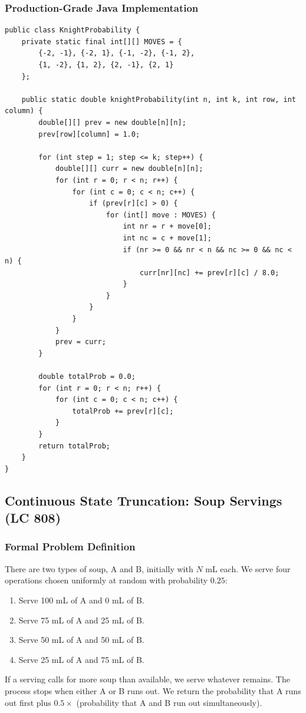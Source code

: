 \documentclass[10pt,journal,compsoc,onecolumn]{IEEEtran}
\begin{document}
\subsubsection{Production-Grade Java Implementation}

\begin{verbatim}
public class KnightProbability {
    private static final int[][] MOVES = {
        {-2, -1}, {-2, 1}, {-1, -2}, {-1, 2},
        {1, -2}, {1, 2}, {2, -1}, {2, 1}
    };

    public static double knightProbability(int n, int k, int row, int column) {
        double[][] prev = new double[n][n];
        prev[row][column] = 1.0;

        for (int step = 1; step <= k; step++) {
            double[][] curr = new double[n][n];
            for (int r = 0; r < n; r++) {
                for (int c = 0; c < n; c++) {
                    if (prev[r][c] > 0) {
                        for (int[] move : MOVES) {
                            int nr = r + move[0];
                            int nc = c + move[1];
                            if (nr >= 0 && nr < n && nc >= 0 && nc < n) {
                                curr[nr][nc] += prev[r][c] / 8.0;
                            }
                        }
                    }
                }
            }
            prev = curr;
        }

        double totalProb = 0.0;
        for (int r = 0; r < n; r++) {
            for (int c = 0; c < n; c++) {
                totalProb += prev[r][c];
            }
        }
        return totalProb;
    }
}
\end{verbatim}

\subsection{Continuous State Truncation: Soup Servings (LC 808)}

\subsubsection{Formal Problem Definition}
There are two types of soup, A and B, initially with $N$ mL each. We serve four operations chosen uniformly at random with probability $0.25$:
\begin{enumerate}
    \item Serve 100 mL of A and 0 mL of B.
    \item Serve 75 mL of A and 25 mL of B.
    \item Serve 50 mL of A and 50 mL of B.
    \item Serve 25 mL of A and 75 mL of B.
\end{enumerate}
If a serving calls for more soup than available, we serve whatever remains. The process stops when either A or B runs out. We return the probability that A runs out first plus $0.5 \times$ (probability that A and B run out simultaneously).
\end{document}
